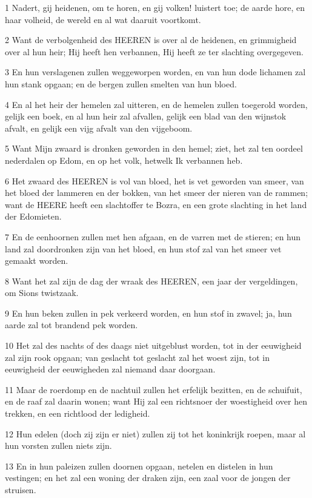 \par 1 Nadert, gij heidenen, om te horen, en gij volken! luistert toe; de aarde hore, en haar volheid, de wereld en al wat daaruit voortkomt.
\par 2 Want de verbolgenheid des HEEREN is over al de heidenen, en grimmigheid over al hun heir; Hij heeft hen verbannen, Hij heeft ze ter slachting overgegeven.
\par 3 En hun verslagenen zullen weggeworpen worden, en van hun dode lichamen zal hun stank opgaan; en de bergen zullen smelten van hun bloed.
\par 4 En al het heir der hemelen zal uitteren, en de hemelen zullen toegerold worden, gelijk een boek, en al hun heir zal afvallen, gelijk een blad van den wijnstok afvalt, en gelijk een vijg afvalt van den vijgeboom.
\par 5 Want Mijn zwaard is dronken geworden in den hemel; ziet, het zal ten oordeel nederdalen op Edom, en op het volk, hetwelk Ik verbannen heb.
\par 6 Het zwaard des HEEREN is vol van bloed, het is vet geworden van smeer, van het bloed der lammeren en der bokken, van het smeer der nieren van de rammen; want de HEERE heeft een slachtoffer te Bozra, en een grote slachting in het land der Edomieten.
\par 7 En de eenhoornen zullen met hen afgaan, en de varren met de stieren; en hun land zal doordronken zijn van het bloed, en hun stof zal van het smeer vet gemaakt worden.
\par 8 Want het zal zijn de dag der wraak des HEEREN, een jaar der vergeldingen, om Sions twistzaak.
\par 9 En hun beken zullen in pek verkeerd worden, en hun stof in zwavel; ja, hun aarde zal tot brandend pek worden.
\par 10 Het zal des nachts of des daags niet uitgeblust worden, tot in der eeuwigheid zal zijn rook opgaan; van geslacht tot geslacht zal het woest zijn, tot in eeuwigheid der eeuwigheden zal niemand daar doorgaan.
\par 11 Maar de roerdomp en de nachtuil zullen het erfelijk bezitten, en de schuifuit, en de raaf zal daarin wonen; want Hij zal een richtsnoer der woestigheid over hen trekken, en een richtlood der ledigheid.
\par 12 Hun edelen (doch zij zijn er niet) zullen zij tot het koninkrijk roepen, maar al hun vorsten zullen niets zijn.
\par 13 En in hun paleizen zullen doornen opgaan, netelen en distelen in hun vestingen; en het zal een woning der draken zijn, een zaal voor de jongen der struisen.
